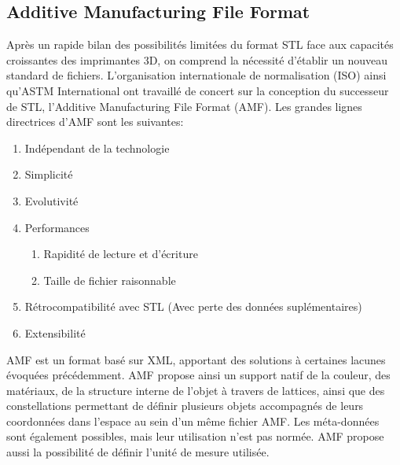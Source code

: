 \documentclass{tnreport}
\begin{document}
\subsection{Additive Manufacturing File Format}
Après un rapide bilan des possibilités limitées du format STL face aux capacités croissantes des imprimantes 3D, on comprend la nécessité d'établir un nouveau standard de fichiers. L'organisation internationale de normalisation (ISO) ainsi qu'ASTM International ont travaillé de concert sur la conception du successeur de STL, l'Additive Manufacturing File Format (AMF). Les grandes lignes directrices d'AMF sont les suivantes:
\begin{enumerate}
  \item Indépendant de la technologie
  \item Simplicité
  \item Evolutivité
  \item Performances
  \begin{enumerate}
    \item Rapidité de lecture et d'écriture
    \item Taille de fichier raisonnable
  \end{enumerate}
  \item Rétrocompatibilité avec STL (Avec perte des données suplémentaires)
  \item Extensibilité
\end{enumerate}
AMF est un format basé sur XML, apportant des solutions à certaines lacunes évoquées précédemment. AMF propose ainsi un support natif de la couleur, des matériaux, de la structure interne de l'objet à travers de lattices, ainsi que des constellations permettant de définir plusieurs objets accompagnés de leurs coordonnées dans l'espace au sein d'un même fichier AMF. Les méta-données sont également possibles, mais leur utilisation n'est pas normée. AMF propose aussi la possibilité de définir l'unité de mesure utilisée. 
\end{document}
